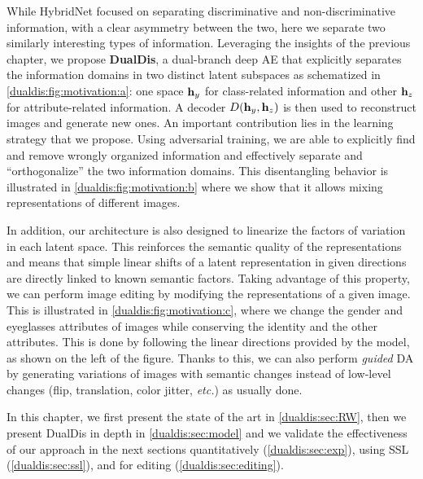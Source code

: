 \begin{figure}[p]
    \label{dualdis:fig:motivation}
\end{figure}

While HybridNet focused on separating discriminative and non-discriminative information, with a clear asymmetry between the two, here we separate two similarly interesting types of information. 
Leveraging the insights of the previous chapter, we propose \textbf{DualDis}, a dual-branch deep \ac{AE} that explicitly separates the information domains in two distinct latent subspaces as schematized in \autoref{dualdis:fig:motivation:a}: one space $\mathbf{h}_y$ for class-related information and other $\mathbf{h}_z$ for attribute-related information. A decoder $D(\mathbf{h}_y, \mathbf{h}_z)$ is then used to reconstruct images and generate new ones.
%
An important contribution lies in the learning strategy that we propose.
Using adversarial training, we are able to explicitly find and remove wrongly organized information and effectively separate and ``orthogonalize'' the two information domains. This disentangling behavior is illustrated in \autoref{dualdis:fig:motivation:b} where we show that it allows mixing representations of different images.

In addition, our architecture is also designed to linearize the factors of variation in each latent space.
This reinforces the semantic quality of the representations and means that simple linear shifts of a latent representation in given directions are directly linked to known semantic factors.
Taking advantage of this property, we can perform image editing by modifying the representations of a given image. This is illustrated in \autoref{dualdis:fig:motivation:c}, where we change the gender and eyeglasses attributes of images while conserving the identity and the other attributes. This is done by following the linear directions provided by the model, as shown on the left of the figure. Thanks to this, we can also perform \textit{guided} \acf{DA} by generating variations of images with semantic changes instead of low-level changes (flip, translation, color jitter, \textit{etc.}) as usually done.

In this chapter, we first present the state of the art in \autoref{dualdis:sec:RW}, then we present DualDis in depth in \autoref{dualdis:sec:model} and we validate the effectiveness of our approach in the next sections quantitatively (\autoref{dualdis:sec:exp}), using \ac{SSL} (\autoref{dualdis:sec:ssl}), and for editing (\autoref{dualdis:sec:editing}).

